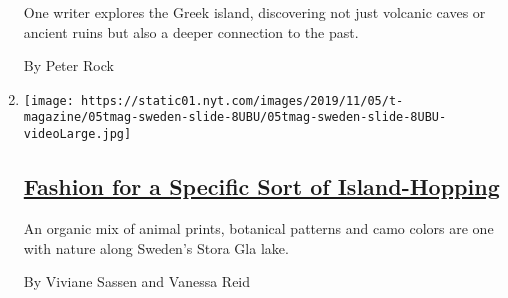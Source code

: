 \begin{enumerate}
  One writer explores the Greek island, discovering not just volcanic
  caves or ancient ruins but also a deeper connection to the past.

  By Peter Rock
\item
  \texttt{[image: https://static01.nyt.com/images/2019/11/05/t-magazine/05tmag-sweden-slide-8UBU/05tmag-sweden-slide-8UBU-videoLarge.jpg]}

  \hypertarget{fashion-for-a-specific-sort-of-island-hopping}{%
  \subsection{\texorpdfstring{\href{/2019/11/05/t-magazine/sweden-fall-fashion.html}{Fashion
  for a Specific Sort of
  Island-Hopping}}{Fashion for a Specific Sort of Island-Hopping}}\label{fashion-for-a-specific-sort-of-island-hopping}}

  An organic mix of animal prints, botanical patterns and camo colors
  are one with nature along Sweden's Stora Gla lake.

  By Viviane Sassen and Vanessa Reid
\end{enumerate}

